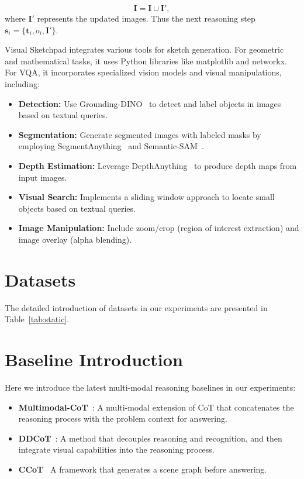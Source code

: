 \begin{equation}
    \mathbf{I} = \mathbf{I} \cup \mathbf{I}',
\end{equation}
where $\mathbf{I}'$ represents the updated images. Thus the next reasoning step $\mathbf{s}_i = \{\mathbf{t}_i, o_i, \mathbf{I}'\}$. 

Visual Sketchpad integrates various tools for sketch generation. For geometric and mathematical tasks, it uses Python libraries like matplotlib and networkx. For VQA, it incorporates specialized vision models and visual manipulations, including:

\begin{itemize}
\item \textbf{Detection:} Use Grounding-DINO~\cite{Groundingdino} to detect and label objects in images based on textual queries.
\item \textbf{Segmentation:} Generate segmented images with labeled masks by employing SegmentAnything~\cite{SegmentAnything} and Semantic-SAM~\cite{SemanticSam}.
\item \textbf{Depth Estimation:} Leverage DepthAnything~\cite{DepthAnything} to produce depth maps from input images.
\item \textbf{Visual Search:} Implements a sliding window approach to locate small objects based on textual queries.
\item \textbf{Image Manipulation:} Include zoom/crop (region of interest extraction) and image overlay (alpha blending).
\end{itemize}



\section{Datasets}
\label{sec:app_dataset}

The detailed introduction of datasets in our experiments are presented in Table~\ref{tab:static}.

\section{Baseline Introduction}
\label{sec:app_baselines}

Here we introduce the latest multi-modal reasoning baselines in our experiments:

\begin{itemize}
    \item \textbf{Multimodal-CoT}~\cite{mcot}: A multi-modal extension of CoT that concatenates the reasoning process with the problem context for answering.
    \item \textbf{DDCoT}~\cite{ddcot}: A method that decouples reasoning and recognition, and then integrate visual capabilities into the reasoning process.
    \item \textbf{CCoT}~\cite{ccot} A framework that generates a scene graph before answering.
\end{itemize}




